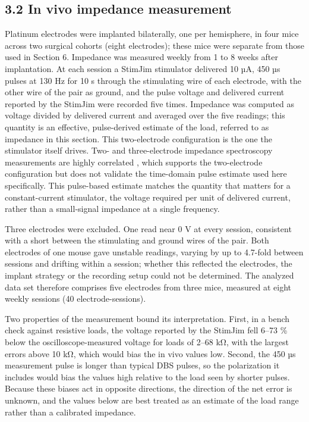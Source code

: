 \subsection{3.2 In vivo impedance measurement}\label{in-vivo-impedance-measurement}

Platinum electrodes were implanted bilaterally, one per hemisphere, in four mice across two surgical cohorts (eight electrodes); these mice were separate from those used in Section 6. Impedance was measured weekly from 1 to 8 weeks after implantation. At each session a StimJim stimulator \citep{cermak2019} delivered 10 µA, 450 µs pulses at 130 Hz for 10 s through the stimulating wire of each electrode, with the other wire of the pair as ground, and the pulse voltage and delivered current reported by the StimJim were recorded five times. Impedance was computed as voltage divided by delivered current and averaged over the five readings; this quantity is an effective, pulse-derived estimate of the load, referred to as impedance in this section. This two-electrode configuration is the one the stimulator itself drives. Two- and three-electrode impedance spectroscopy measurements are highly correlated \citep{koo2018}, which supports the two-electrode configuration but does not validate the time-domain pulse estimate used here specifically. This pulse-based estimate matches the quantity that matters for a constant-current stimulator, the voltage required per unit of delivered current, rather than a small-signal impedance at a single frequency.

Three electrodes were excluded. One read near 0 V at every session, consistent with a short between the stimulating and ground wires of the pair. Both electrodes of one mouse gave unstable readings, varying by up to 4.7-fold between sessions and drifting within a session; whether this reflected the electrodes, the implant strategy or the recording setup could not be determined. The analyzed data set therefore comprises five electrodes from three mice, measured at eight weekly sessions (40 electrode-sessions).

Two properties of the measurement bound its interpretation. First, in a bench check against resistive loads, the voltage reported by the StimJim fell 6--73 \% below the oscilloscope-measured voltage for loads of 2--68 kΩ, with the largest errors above 10 kΩ, which would bias the in vivo values low. Second, the 450 µs measurement pulse is longer than typical DBS pulses, so the polarization it includes would bias the values high relative to the load seen by shorter pulses. Because these biases act in opposite directions, the direction of the net error is unknown, and the values below are best treated as an estimate of the load range rather than a calibrated impedance.

